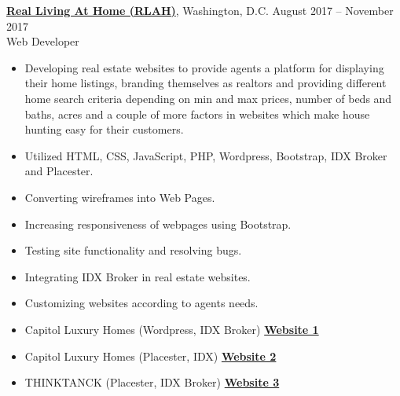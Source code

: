 \documentclass[margin,line]{res}
\begin{document}
\begin{resume}
\begin{itemize}

 \end{itemize}

\href{http://www.rlathome.com/}{\noindent\bf Real Living At Home (RLAH)}, Washington, D.C. \hfill{August 2017 -- November 2017}\\
Web Developer
\begin{itemize} \itemsep -2pt  %
 \item Developing real estate websites to provide agents a platform for displaying their home listings, branding themselves as realtors and providing different home search criteria depending on min and max prices, number of beds and baths, acres and a couple of more factors in websites which make house hunting easy for their customers. 
 \item Utilized HTML, CSS, JavaScript, PHP, Wordpress, Bootstrap, IDX Broker and Placester.
 \item Converting wireframes into Web Pages.
 \item Increasing responsiveness of webpages using Bootstrap.
 \item Testing site functionality and resolving bugs.
 \item Integrating IDX Broker in real estate websites.
 \item Customizing websites according to agents needs.
 \item Capitol Luxury Homes (Wordpress, IDX Broker) \href{http://dev.capitolluxuryhomes.com/}{\bf Website 1}
 \item Capitol Luxury Homes (Placester, IDX) \href{http://bit.ly/2gMSN8T}{\bf Website 2}
 \item THINKTANCK (Placester, IDX Broker) \href{http://justinlevitch2.myrealestateplatform.com}{\bf Website 3}


 \end{itemize}


\end{resume}
\end{document}
